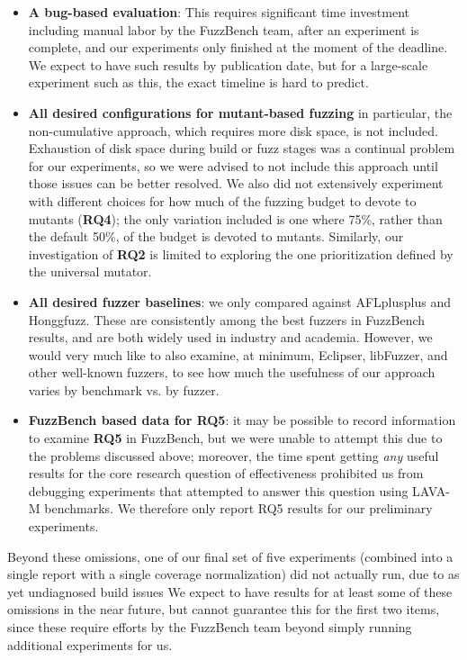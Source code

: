 \begin{itemize}
\item {\bf A bug-based evaluation}:  This requires significant time investment including manual labor by the FuzzBench team, after an experiment is complete, and our experiments only finished at the moment of the deadline.  We expect to have such results by publication date, but for a large-scale experiment such as this, the exact timeline is hard to predict.
\item {\bf All desired configurations for mutant-based fuzzing} in particular, the non-cumulative approach, which requires more disk space, is not included.  Exhaustion of disk space during build or fuzz stages was a continual problem for our experiments, so we were advised to not include this approach until those issues can be better resolved.  We also did not extensively experiment with different choices for how much of the fuzzing budget to devote to mutants ({\bf RQ4}); the only variation included is one where 75\%, rather than the default 50\%, of the budget is devoted to mutants.  Similarly, our investigation of {\bf RQ2} is limited to exploring the one prioritization defined by the universal mutator.
\item {\bf All desired fuzzer baselines}: we only compared against AFLplusplus and Honggfuzz.  These are consistently among the  best fuzzers in FuzzBench results, and are both widely used in industry and academia.  However, we would very much like to also examine, at minimum, Eclipser, libFuzzer, and other well-known fuzzers, to see how much the usefulness of our approach varies by benchmark vs. by fuzzer.
  \item {\bf FuzzBench based data for RQ5}: it may be possible to record information to examine {\bf RQ5} in FuzzBench, but we were unable to attempt this due to the problems discussed above; moreover, the time spent getting \emph{any} useful results for the core research question of effectiveness prohibited us from debugging experiments that attempted to answer this question using LAVA-M benchmarks.   We therefore only report RQ5 results for our preliminary experiments.
\end{itemize}

Beyond these omissions, one of our final set of five experiments (combined into a single report with a single coverage normalization) did not actually run, due to as yet undiagnosed build issues
We expect to have results for at least some of these omissions in the near future, but cannot guarantee this for the first two items, since these require efforts by the FuzzBench team beyond simply running additional experiments for us.

